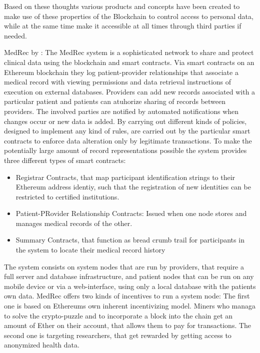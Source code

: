 Based on these thoughts various products and concepts have been created to make use of these properties of the Blockchain to control access to personal data, while at the same time make it accessible at all times through third parties if needed. 

MedRec by \citeauthor{Azaria2016}:
The MedRec system is a sophisticated network to share and protect clinical data using the blockchain and smart contracts. Via smart contracts on an Ethereum blockchain they log patient-provider relationships that associate a medical record with viewing permissions and data retrieval instructions of execution on external databases.
Providers can add new records associated with a particular patient and patients can atuhorize sharing of records between providers. The involved parties are notified by automated notifications when changes occur or new data is added.
By carrying out different kinds of policies, designed to implement any kind of rules, are carried out by the particular smart contracts to enforce data alteration only by legitimate transactions.
To make the potentially large amount of record representations possible the system provides three different types of smart contracts: 
\begin{itemize}
	\item Registrar Contracts, that map participant identification strings to their Ethereum address identiy, such that the registration of new identities can be restricted to certified institutions.
	\item Patient-PRovider Relationship Contracts: Issued when one node stores and manages medical records of the other.
	\item Summary Contracts, that function as bread crumb trail for participants in the system to locate their medical record history
\end{itemize}

The system consists on system nodes that are run by providers, that require a full server and database infrastructure, and patient nodes that can be run on any mobile device or via a web-interface, using only a local database with the patients own data.
MedRec offers two kinds of incentives to run a system node:
The first one is based on Ethereums own inherent incentivizing model. Miners who managa to solve the crypto-puzzle and to incorporate a block into the chain get an amount of Ether on their account, that allows them to pay for transactions.
The second one is targeting researchers, that get rewarded by getting access to anonymized health data.


